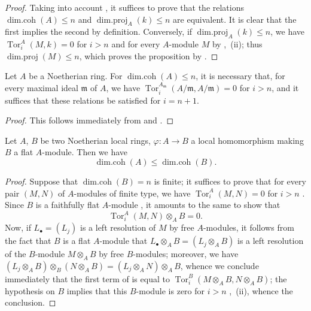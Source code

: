 \begin{proof}
Taking into account , it suffices to prove that the relations $\operatorname{dim.coh}(A)\leq n$ and $\operatorname{dim.proj}_A(k)\leq n$ are equivalent.
It is clear that the first implies the second by definition.
Conversely, if $\operatorname{dim.proj}_A(k)\leq n$, we have $\operatorname{Tor}^A_i(M,k)=0$ for $i>n$ and for every $A$-module $M$ by ,~(ii);
thus $\operatorname{dim.proj}(M)\leq n$, which proves the proposition by .
\end{proof}

\begin{corollary}[17.2.12]
\label{0.17.2.12}
Let $A$ be a Noetherian ring.
For $\operatorname{dim.coh}(A)\leq n$, it is necessary that, for every maximal ideal $\mathfrak{m}$ of $A$, we have $\operatorname{Tor}^{A_\mathfrak{m}}_i(A/\mathfrak{m},A/\mathfrak{m})=0$ for $i>n$, and it suffices that these relations be satisfied for $i=n+1$.
\end{corollary}

\begin{proof}
This follows immediately from  and .
\end{proof}

\begin{proposition}[17.2.13]
\label{0.17.2.13}
Let $A$, $B$ be two Noetherian local rings, $\varphi:A\to B$ a local homomorphism making $B$ a flat $A$-module.
Then we have
\[
\label{0.17.2.13.1}
  \operatorname{dim.coh}(A)\leq\operatorname{dim.coh}(B).
  \tag{17.2.13.1}
\]
\end{proposition}

\begin{proof}
Suppose that $\operatorname{dim.coh}(B)=n$ is finite;
it suffices to prove that for every pair $(M,N)$ of $A$-modules of finite type, we have $\operatorname{Tor}^A_i(M,N)=0$ for $i>n$ .
Since $B$ is a faithfully flat $A$-module , it amounts to the same  to show that
\[
\label{0.17.2.13.2}
  \operatorname{Tor}^A_i(M,N)\otimes_A B=0.
  \tag{17.2.13.2}
\]
Now, if $L_\bullet=(L_j)$ is a left resolution of $M$ by free $A$-modules, it follows from the fact that $B$ is a flat $A$-module that $L_\bullet\otimes_A B=(L_j\otimes_A B)$ is a left resolution of the $B$-module $M\otimes_A B$ by free $B$-modules;
moreover, we have $(L_j\otimes_A B)\otimes_B(N\otimes_A B)=(L_j\otimes_A N)\otimes_A B$, whence we conclude immediately that the first term of  is equal to $\operatorname{Tor}^B_i(M\otimes_A B,N\otimes_A B)$;
the hypothesis on $B$ implies that this $B$-module is zero for $i>n$ ,~(ii), whence the conclusion.
\end{proof}

